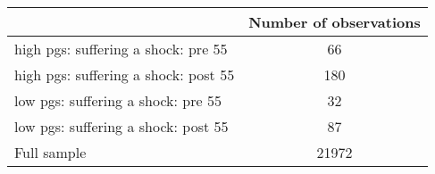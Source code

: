 % 
\begin{tabular}{lc}
  \toprule
 & Number of observations \\ 
  \midrule
high pgs: suffering a shock: pre 55 &  66 \\ 
   \midrule
high pgs: suffering a shock: post 55 & 180 \\ 
  low pgs: suffering a shock: pre 55 &  32 \\ 
  low pgs: suffering a shock: post 55 &  87 \\ 
  Full sample & 21972 \\ 
   \bottomrule
\end{tabular}
